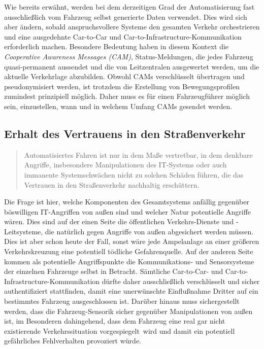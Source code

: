 \documentclass[twoside,a4paper,12pt]{article}
\begin{document}
Wie bereits erwähnt, werden bei dem derzeitigen Grad der Automatisierung fast ausschließlich vom Fahrzeug selbst generierte Daten verwendet.
Dies wird sich aber ändern, sobald anspruchsvollere Systeme den gesamten Verkehr orchestrieren und eine ausgedehnte Car-to-Car und 
Car-to-Infrastructure-Kommunikation erforderlich machen. Besondere Bedeutung haben in diesem Kontext die \textit{Cooperative Awareness Messages (CAM)},
Status-Meldungen, die jedes Fahrzeug quasi-permanent aussendet und die von Leitzentralen ausgewertet werden, um die aktuelle Verkehrlage abzubilden.
Obwohl CAMs verschlüsselt übertragen und pseudonymisiert werden, ist trotzdem die Erstellung von Bewegungsprofilen zumindest prinzipiell möglich.
Daher muss es für einen Fahrzeugführer möglich sein, einzustellen, wann und in welchem Umfang CAMs gesendet werden.

\subsection{Erhalt des Vertrauens in den Straßenverkehr} \label{ErhaltDesVertrauensInDenStrassenverkehr}

\begin{quote}
\glqq
Automatisiertes Fahren ist nur in dem Maße vertretbar, in dem denkbare Angriffe, insbesondere Manipulationen des 
IT-Systems oder auch immanente Systemschwächen nicht
zu solchen Schäden führen, die das Vertrauen in den Straßenverkehr nachhaltig erschüttern.\grqq\mbox{~\cite[S. 12]{ek}}
\end{quote}

Die Frage ist hier, welche Komponenten des Gesamtsystems anfällig gegenüber böswilligen IT-Angriffen von außen sind und welcher Natur potentielle Angriffe
wären. Dies sind auf der einen Seite die öffentlichen Verkehrs-Dienste und -Leitsysteme, die natürlich gegen Angriffe von außen abgesichert werden müssen. 
Dies ist aber schon heute der Fall, sonst wäre jede Ampelanlage an einer größeren Verkehrskreuzung eine potentiell tödliche Gefahrenquelle. Auf der anderen Seite kommen als potentielle Angriffspunkte die Kommunikations- und Sensorsysteme der einzelnen Fahrzeuge selbst in Betracht. Sämtliche Car-to-Car- und Car-to-Infrastructure-Kommunikation dürfte daher ausschließlich verschlüsselt und sicher authentifiziert stattfinden, damit eine unerwünschte Einflußnahme Dritter auf ein bestimmtes Fahrzeug ausgeschlossen ist. Darüber hinaus muss sichergestellt werden, dass die Fahrzeug-Sensorik sicher gegenüber Manipulationen von außen ist, 
im Besonderen dahingehend, dass dem Fahrzeug eine real gar nicht existierende Verkehrssituation \glqq vorgespiegelt\grqq\ wird und damit ein potentiell 
gefährliches Fehlverhalten provoziert würde.
\end{document}
